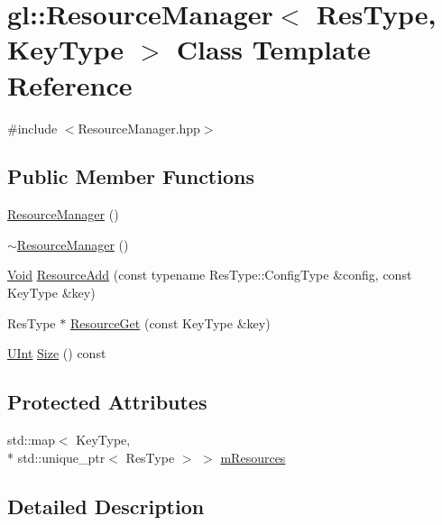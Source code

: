 \hypertarget{classgl_1_1_resource_manager}{\section{gl\-:\-:Resource\-Manager$<$ Res\-Type, Key\-Type $>$ Class Template Reference}
\label{classgl_1_1_resource_manager}
}


{\ttfamily \#include $<$Resource\-Manager.\-hpp$>$}

\subsection*{Public Member Functions}
\begin{DoxyCompactItemize}
\item 
\hyperlink{classgl_1_1_resource_manager_a8a03114e394305bea3cd67a611f3100c}{Resource\-Manager} ()
\item 
\hyperlink{classgl_1_1_resource_manager_a98923a7788170cdf6e3eb06f16c9c728}{$\sim$\-Resource\-Manager} ()
\item 
\hyperlink{_basic_types_8hpp_afdf0f22c576e6ee1b982f64b839c4bea}{Void} \hyperlink{classgl_1_1_resource_manager_acd4a15d51a31ff7871260bfe9d133b19}{Resource\-Add} (const typename Res\-Type\-::\-Config\-Type \&config, const Key\-Type \&key)
\item 
Res\-Type $\ast$ \hyperlink{classgl_1_1_resource_manager_a76295508c8e6d50a829898ee55a10b68}{Resource\-Get} (const Key\-Type \&key)
\item 
\hyperlink{_basic_types_8hpp_a11c112f01a7ad8f767fd48bc916463a3}{U\-Int} \hyperlink{classgl_1_1_resource_manager_ad0a49cad4c53ec3a44b348b7fa200729}{Size} () const 
\end{DoxyCompactItemize}
\subsection*{Protected Attributes}
\begin{DoxyCompactItemize}
\item 
std\-::map$<$ Key\-Type, \\*
std\-::unique\-\_\-ptr$<$ Res\-Type $>$ $>$ \hyperlink{classgl_1_1_resource_manager_a1e9a623c449cb5a99362f02058a60ae2}{m\-Resources}
\end{DoxyCompactItemize}


\subsection{Detailed Description}
